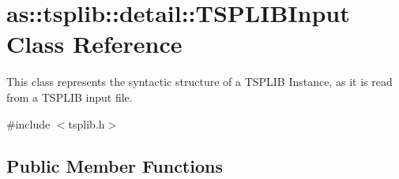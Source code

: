 \hypertarget{classas_1_1tsplib_1_1detail_1_1TSPLIBInput}{}\section{as\+:\+:tsplib\+:\+:detail\+:\+:T\+S\+P\+L\+I\+B\+Input Class Reference}
\label{classas_1_1tsplib_1_1detail_1_1TSPLIBInput}


This class represents the syntactic structure of a T\+S\+P\+L\+IB Instance, as it is read from a T\+S\+P\+L\+IB input file.  




{\ttfamily \#include $<$tsplib.\+h$>$}

\subsection*{Public Member Functions}
